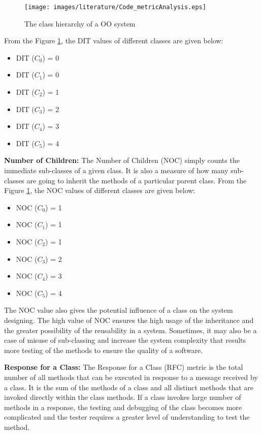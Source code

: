 \documentclass[12pt]{report}
\begin{document}
\begin{figure}[h!]
  \centering
    \texttt{[image: images/literature/Code\_metricAnalysis.eps]}
		\caption{The class hierarchy of a OO system}
		\label{dit_codeMetrics}
\end{figure}
From the Figure \ref{dit_codeMetrics}, the DIT values of different classes are given below:
\begin{itemize}
\item DIT ($C_{0}$) = 0
\item DIT ($C_{1}$) = 0
\item DIT ($C_{2}$) = 1
\item DIT ($C_{3}$) = 2
\item DIT ($C_{4}$) = 3
\item DIT ($C_{5}$) = 4
\end{itemize}

\textbf{Number of Children:}
The Number of Children (NOC) simply counts the immediate sub-classes of a given class. It is also a measure of how many sub-classes are going to inherit the methods of a particular parent class. From the Figure \ref{dit_codeMetrics}, the NOC values of different classes are given below:

\begin{itemize}
\item NOC ($C_{0}$) = 1
\item NOC ($C_{1}$) = 1
\item NOC ($C_{2}$) = 1
\item NOC ($C_{3}$) = 2
\item NOC ($C_{4}$) = 3
\item NOC ($C_{5}$) = 4
\end{itemize}

The NOC value also gives the potential influence of a class on the system designing. The high value of NOC ensures the high usage of the inheritance and the greater possibility of the reusability in a system. Sometimes, it may also be a case of misuse of sub-classing and increase the system complexity that results more testing of the methods to ensure the quality of a software.

\textbf{Response for a Class:} 
The Response for a Class (RFC) metric is the total number of all methods that can be executed in response to a message received by a class. It is the sum of the methods of a class and all distinct methods that are invoked directly within the class methods. If a class invokes large number of methods in a response, the testing and debugging of the class becomes more complicated and  the tester requires a greater level of understanding to test the method. 
\end{document}
